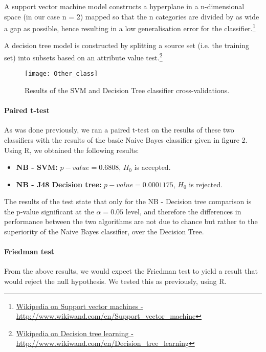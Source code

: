 \documentclass[12pt,a4paper]{report}
\begin{document}
A support vector machine model constructs a hyperplane in a n-dimensional space (in our case n = 2) mapped so that the n categories are divided by as wide a gap as possible, hence resulting in a low generalisation error for the classifier.\footnote{\href{http://www.wikiwand.com/en/Support\_vector\_machine}{Wikipedia on Support vector machines - http://www.wikiwand.com/en/Support\_vector\_machine}} 

A decision tree model is constructed by splitting a source set (i.e. the training set) into subsets based on an attribute value test.\footnote{\href{http://www.wikiwand.com/en/Decision\_tree\_learning}{Wikipedia on Decision tree learning - http://www.wikiwand.com/en/Decision\_tree\_learning}}

\begin{figure}
\texttt{[image: Other\_class]}
\centering
\caption{Results of the SVM and Decision Tree classifier cross-validations.}
\end{figure}

\paragraph*{Paired t-test}
As was done previously, we ran a paired t-test on the results of these two classifiers with the results of the basic Naive Bayes classifier given in figure 2. Using R, we obtained the following results:

\begin{itemize}
\item \textbf{NB - SVM:} $ p-value = 0.6808 $, $ H_0 $ is accepted.
\item \textbf{NB - J48 Decision tree:} $ p-value = 0.0001175 $, $ H_0 $ is rejected. 
\end{itemize}

The results of the test state that only for the NB - Decision tree comparison is the p-value significant at the $ \alpha = 0.05 $ level, and therefore the differences in performance between the two algorithms are not due to chance but rather to the superiority of the Naive Bayes classifier, over the Decision Tree.

\paragraph*{Friedman test}
From the above results, we would expect the Friedman test to yield a result that would reject the null hypothesis. We tested this as previously, using R.
\end{document}
